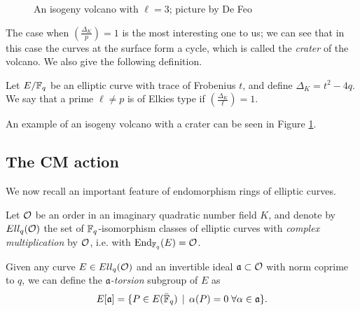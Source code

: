 \begin{figure}
    \centering
    \caption{An isogeny volcano with $\ell=3$; picture by De Feo}
    \label{picture_volcano}
\end{figure}

The case when $\left( \frac{\Delta_K}{p} \right)=1$ is the most interesting one to us; we can see that in this case the curves at the surface form a cycle, which is called the \emph{crater} of the volcano. We also give the following definition.
\begin{definition}
    Let $E/\mathbb{F}_q$ be an elliptic curve with trace of Frobenius $t$, and define $\Delta_K=t^2-4q$. We say that a prime $\ell\neq p$ is of Elkies type if $\left( \frac{\Delta_K}{\ell} \right)=1$.
\end{definition}

An example of an isogeny volcano with a crater can be seen in Figure \ref{picture_volcano}.

\subsection{The CM action}
We now recall an important feature of endomorphism rings of elliptic curves.

Let $\mathcal{O}$ be an order in an imaginary quadratic number field $K$, and denote by $Ell_q(\mathcal{O})$ the set of $\mathbb{F}_q$-isomorphism classes of elliptic curves with \emph{complex multiplication} by $\mathcal{O}$, i.e. with $\operatorname{End}_{\mathbb{F}_q}(E)=\mathcal{O}$.

Given any curve $E\in Ell_q(\mathcal{O})$ and an invertible ideal $\mathfrak{a}\subset\mathcal{O}$ with norm coprime to $q$, we can define the \emph{$\mathfrak{a}$-torsion} subgroup of $E$ as $$E[\mathfrak{a}]=\{ P\in E(\bar{\mathbb{F}}_q) \operatorname{\; |\;} \alpha(P)=0\;\forall\alpha\in\mathfrak{a} \}.$$

